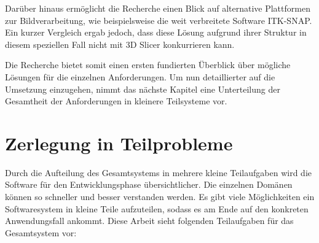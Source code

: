 Darüber hinaus ermöglicht die Recherche einen Blick auf alternative Plattformen zur
Bildverarbeitung, wie beispielsweise die weit verbreitete Software \ac{ITK-SNAP}.
Ein kurzer Vergleich ergab jedoch, dass diese Lösung aufgrund ihrer Struktur in diesem
speziellen Fall nicht mit 3D Slicer konkurrieren kann.

Die Recherche bietet somit einen ersten fundierten Überblick über mögliche Lösungen
für die einzelnen Anforderungen. Um nun detaillierter auf die Umsetzung
einzugehen, nimmt das nächste Kapitel eine Unterteilung der Gesamtheit der Anforderungen
in kleinere Teilsysteme vor.

\section{Zerlegung in Teilprobleme}
\label{sec_zerlegung_in_teilprobleme} Durch die Aufteilung des Gesamtsystems in mehrere
kleine Teilaufgaben wird die Software für den Entwicklungsphase übersichtlicher.
Die einzelnen Domänen können so schneller und besser verstanden werden. Es gibt viele
Möglichkeiten ein Softwaresystem in kleine Teile aufzuteilen, sodass es am Ende
auf den konkreten Anwendungsfall ankommt. Diese Arbeit sieht folgenden Teilaufgaben
für das Gesamtsystem vor:

